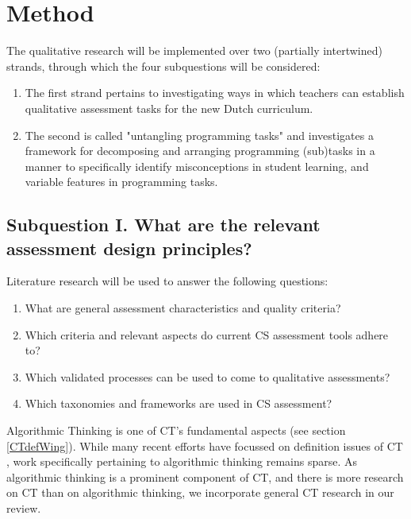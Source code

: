 \section{Method}\label{sec:method}




The qualitative research will be implemented over two (partially intertwined) strands, through which the four subquestions will be considered:
\begin{enumerate}
\item The first strand pertains to investigating ways in which teachers can establish qualitative assessment tasks for the new Dutch curriculum.
\item The second is called "untangling programming tasks" and investigates a framework for decomposing and arranging programming (sub)tasks in a manner to specifically identify misconceptions in student learning, and variable features in programming tasks.
\end{enumerate}




\subsection{Subquestion I. What are the relevant assessment design principles?}%
Literature research will be used to answer the following questions:

\begin{enumerate}
\item What are general assessment characteristics and quality criteria?
\item Which criteria and relevant aspects do current CS assessment tools adhere to?
\item Which validated processes can be used to come to qualitative assessments?
\item Which taxonomies and frameworks are used in CS assessment?
\end{enumerate}

Algorithmic Thinking is one of CT's fundamental aspects (see section \ref{CTdefWing}). While many recent efforts have focussed on definition issues of CT \cite{GroverPea2013}, work specifically pertaining to algorithmic thinking remains sparse. As algorithmic thinking is a prominent component of CT, and there is more research on CT than on algorithmic thinking, we incorporate general CT research in our review.



